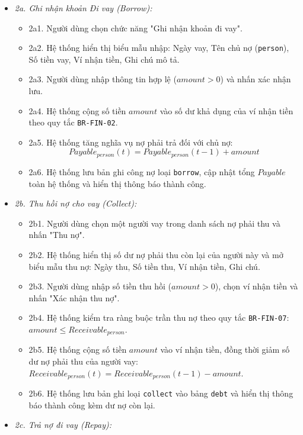 \documentclass[11pt,a4paper]{article}
\providecommand{\tightlist}{
  \setlength{\itemsep}{0pt}\setlength{\parskip}{0pt}}
\begin{document}
\begin{itemize}
  \begin{itemize}
  \tightlist
  \item
    \emph{2a. Ghi nhận khoản Đi vay (Borrow):}

    \begin{itemize}
    \tightlist
    \item
      2a1. Người dùng chọn chức năng "Ghi nhận khoản đi vay".
    \item
      2a2. Hệ thống hiển thị biểu mẫu nhập: Ngày vay, Tên chủ nợ
      (\texttt{person}), Số tiền vay, Ví nhận tiền, Ghi chú mô tả.
    \item
      2a3. Người dùng nhập thông tin hợp lệ (\(amount > 0\)) và nhấn xác
      nhận lưu.
    \item
      2a4. Hệ thống cộng số tiền \(amount\) vào số dư khả dụng của ví
      nhận tiền theo quy tắc \texttt{BR-FIN-02}.
    \item
      2a5. Hệ thống tăng nghĩa vụ nợ phải trả đối với chủ nợ:
      \[
      Payable_{person}(t) = Payable_{person}(t-1) + amount
      \]
    \item
      2a6. Hệ thống lưu bản ghi công nợ loại \texttt{borrow}, cập nhật
      tổng \(Payable\) toàn hệ thống và hiển thị thông báo thành công.
    \end{itemize}
  \item
    \emph{2b. Thu hồi nợ cho vay (Collect):}

    \begin{itemize}
    \tightlist
    \item
      2b1. Người dùng chọn một người vay trong danh sách nợ phải thu và
      nhấn "Thu nợ".
    \item
      2b2. Hệ thống hiển thị số dư nợ phải thu còn lại của người này và
      mở biểu mẫu thu nợ: Ngày thu, Số tiền thu, Ví nhận tiền, Ghi chú.
    \item
      2b3. Người dùng nhập số tiền thu hồi (\(amount > 0\)), chọn ví
      nhận tiền và nhấn "Xác nhận thu nợ".
    \item
      2b4. Hệ thống kiểm tra ràng buộc trần thu nợ theo quy tắc
      \texttt{BR-FIN-07}: \(amount \le Receivable_{person}\).
    \item
      2b5. Hệ thống cộng số tiền \(amount\) vào ví nhận tiền, đồng thời
      giảm số dư nợ phải thu của người vay:
      \(Receivable_{person}(t) = Receivable_{person}(t-1) - amount\).
    \item
      2b6. Hệ thống lưu bản ghi loại \texttt{collect} vào bảng
      \texttt{debt} và hiển thị thông báo thành công kèm dư nợ còn lại.
    \end{itemize}
  \item
    \emph{2c. Trả nợ đi vay (Repay):}


\end{itemize}
\end{itemize}
\end{document}

